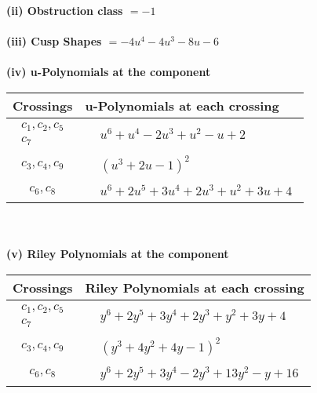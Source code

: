 \documentclass[1p]{elsarticle_modified}
\theoremstyle{definition}
\begin{document}
\flushleft \textbf{(ii) Obstruction class $= -1$}\\~\\
\flushleft \textbf{(iii) Cusp Shapes $= -4 u^4-4 u^3-8 u-6$}\\~\\
\newpage\renewcommand{\arraystretch}{1}
\flushleft \textbf{(iv) u-Polynomials at the component}\newline \\
\begin{tabular}{m{50pt}|m{274pt}}
Crossings & \hspace{64pt}u-Polynomials at each crossing \\
\hline $$\begin{aligned}c_{1},c_{2},c_{5}\\c_{7}\end{aligned}$$&$\begin{aligned}
&u^6+u^4-2 u^3+u^2- u+2
\end{aligned}$\\
\hline $$\begin{aligned}c_{3},c_{4},c_{9}\end{aligned}$$&$\begin{aligned}
&(u^3+2 u-1)^2
\end{aligned}$\\
\hline $$\begin{aligned}c_{6},c_{8}\end{aligned}$$&$\begin{aligned}
&u^6+2 u^5+3 u^4+2 u^3+u^2+3 u+4
\end{aligned}$\\
\hline
\end{tabular}\\~\\
\newpage\renewcommand{\arraystretch}{1}
\flushleft \textbf{(v) Riley Polynomials at the component}\newline \\
\begin{tabular}{m{50pt}|m{274pt}}
Crossings & \hspace{64pt}Riley Polynomials at each crossing \\
\hline $$\begin{aligned}c_{1},c_{2},c_{5}\\c_{7}\end{aligned}$$&$\begin{aligned}
&y^6+2 y^5+3 y^4+2 y^3+y^2+3 y+4
\end{aligned}$\\
\hline $$\begin{aligned}c_{3},c_{4},c_{9}\end{aligned}$$&$\begin{aligned}
&(y^3+4 y^2+4 y-1)^2
\end{aligned}$\\
\hline $$\begin{aligned}c_{6},c_{8}\end{aligned}$$&$\begin{aligned}
&y^6+2 y^5+3 y^4-2 y^3+13 y^2- y+16
\end{aligned}$\\
\hline
\end{tabular}\\~\\
\end{document}

